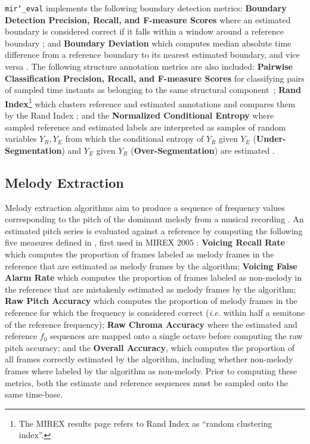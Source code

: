 \documentclass{article}
\def\ie{\emph{i.e.}}
\def\mireval{\texttt{mir\char`_eval}}
\begin{document}
\mireval{} implements the following boundary detection metrics:
\textbf{Boundary Detection Precision, Recall, and F-measure Scores} where an estimated boundary is considered correct if it falls within a window around a reference boundary \cite{turnbull2007supervised};
and \textbf{Boundary Deviation} which computes median absolute time difference from a reference boundary to its nearest estimated boundary, and vice versa \cite{turnbull2007supervised}.
The following structure annotation metrics are also included:
\textbf{Pairwise Classification Precision, Recall, and F-measure Scores} for classifying pairs of sampled time instants as belonging to the same structural component~\cite{levy2008structural};
\textbf{Rand Index}\footnote{The MIREX results page refers to Rand Index as ``random clustering index''.} which clusters reference and estimated annotations and compares them by the Rand Index \cite{rand1971objective};
and the \textbf{Normalized Conditional Entropy} where sampled reference and estimated labels are interpreted as samples of random variables $Y_R, Y_E$ from which the conditional entropy of $Y_R$ given $Y_E$ (\textbf{Under-Segmentation}) and $Y_E$ given $Y_R$  (\textbf{Over-Segmentation}) are estimated \cite{lukashevich2008towards}.

\subsection{Melody Extraction}

Melody extraction algorithms aim to produce a sequence of frequency values corresponding to the pitch of the dominant melody from a musical recording \cite{salamon:MelodyReview:IEEESPM13}.
An estimated pitch series is evaluated against a reference by computing the following five measures defined in \cite{salamon:MelodyReview:IEEESPM13}, first used in MIREX 2005 \cite{polinerMelodyEval}:
\textbf{Voicing Recall Rate} which computes the proportion of frames labeled as melody frames in the reference that are estimated as melody frames by the algorithm;
\textbf{Voicing False Alarm Rate} which computes the proportion of frames labeled as non-melody in the reference that are mistakenly estimated as melody frames by the algorithm;
\textbf{Raw Pitch Accuracy} which computes the proportion of melody frames in the reference for which the frequency is considered correct (\ie{} within half a semitone of the reference frequency);
\textbf{Raw Chroma Accuracy} where the estimated and reference $f_0$ sequences are mapped onto a single octave before computing the raw pitch accuracy;
and the \textbf{Overall Accuracy}, which computes the proportion of all frames correctly estimated by the algorithm, including whether non-melody frames where labeled by the algorithm as non-melody.
Prior to computing these metrics, both the estimate and reference sequences must be sampled onto the same time-base.
\end{document}

